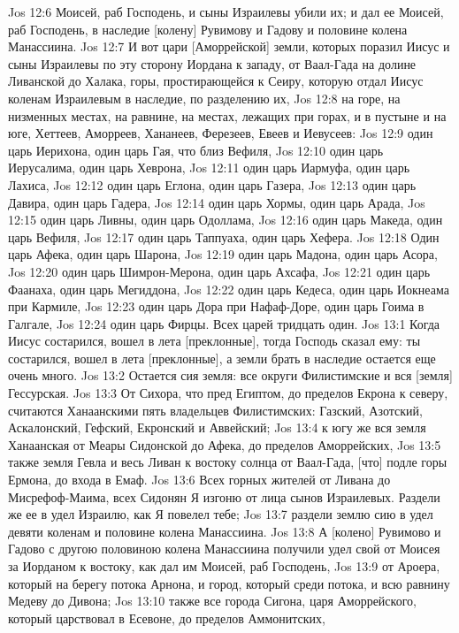 Jos 12:6  Моисей, раб Господень, и сыны Израилевы убили их; и дал ее Моисей, раб Господень, в наследие [колену] Рувимову и Гадову и половине колена Манассиина.
Jos 12:7  И вот цари [Аморрейской] земли, которых поразил Иисус и сыны Израилевы по эту сторону Иордана к западу, от Ваал-Гада на долине Ливанской до Халака, горы, простирающейся к Сеиру, которую отдал Иисус коленам Израилевым в наследие, по разделению их,
Jos 12:8  на горе, на низменных местах, на равнине, на местах, лежащих при горах, и в пустыне и на юге, Хеттеев, Аморреев, Хананеев, Ферезеев, Евеев и Иевусеев:
Jos 12:9  один царь Иерихона, один царь Гая, что близ Вефиля,
Jos 12:10  один царь Иерусалима, один царь Хеврона,
Jos 12:11  один царь Иармуфа, один царь Лахиса,
Jos 12:12  один царь Еглона, один царь Газера,
Jos 12:13  один царь Давира, один царь Гадера,
Jos 12:14  один царь Хормы, один царь Арада,
Jos 12:15  один царь Ливны, один царь Одоллама,
Jos 12:16  один царь Македа, один царь Вефиля,
Jos 12:17  один царь Таппуаха, один царь Хефера.
Jos 12:18  Один царь Афека, один царь Шарона,
Jos 12:19  один царь Мадона, один царь Асора,
Jos 12:20  один царь Шимрон-Мерона, один царь Ахсафа,
Jos 12:21  один царь Фаанаха, один царь Мегиддона,
Jos 12:22  один царь Кедеса, один царь Иокнеама при Кармиле,
Jos 12:23  один царь Дора при Нафаф-Доре, один царь Гоима в Галгале,
Jos 12:24  один царь Фирцы. Всех царей тридцать один.
Jos 13:1  Когда Иисус состарился, вошел в лета [преклонные], тогда Господь сказал ему: ты состарился, вошел в лета [преклонные], а земли брать в наследие остается еще очень много.
Jos 13:2  Остается сия земля: все округи Филистимские и вся [земля] Гессурская.
Jos 13:3  От Сихора, что пред Египтом, до пределов Екрона к северу, считаются Ханаанскими пять владельцев Филистимских: Газский, Азотский, Аскалонский, Гефский, Екронский и Аввейский;
Jos 13:4  к югу же вся земля Ханаанская от Меары Сидонской до Афека, до пределов Аморрейских,
Jos 13:5  также земля Гевла и весь Ливан к востоку солнца от Ваал-Гада, [что] подле горы Ермона, до входа в Емаф.
Jos 13:6  Всех горных жителей от Ливана до Мисрефоф-Маима, всех Сидонян Я изгоню от лица сынов Израилевых. Раздели же ее в удел Израилю, как Я повелел тебе;
Jos 13:7  раздели землю сию в удел девяти коленам и половине колена Манассиина.
Jos 13:8  А [колено] Рувимово и Гадово с другою половиною колена Манассиина получили удел свой от Моисея за Иорданом к востоку, как дал им Моисей, раб Господень,
Jos 13:9  от Ароера, который на берегу потока Арнона, и город, который среди потока, и всю равнину Медеву до Дивона;
Jos 13:10  также все города Сигона, царя Аморрейского, который царствовал в Есевоне, до пределов Аммонитских,
